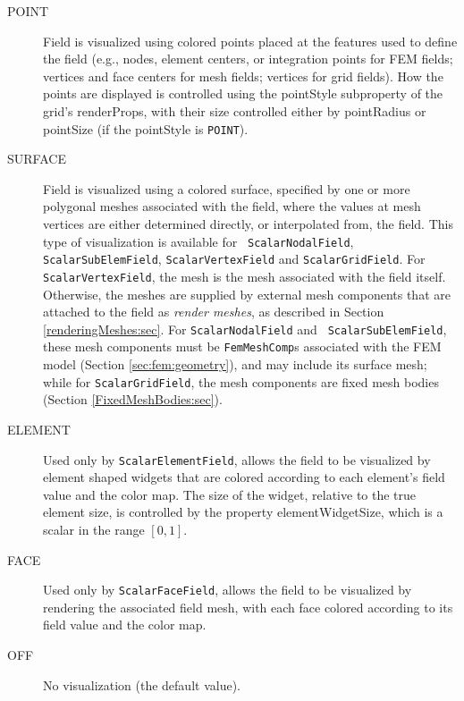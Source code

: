 \begin{description}

\item[POINT]\mbox{}

Field is visualized using colored points placed at the features used
to define the field (e.g., nodes, element centers, or integration
points for FEM fields; vertices and face centers for mesh fields;
vertices for grid fields). How the points are displayed is controlled
using the {\sf pointStyle} subproperty of the grid's {\sf
renderProps}, with their size controlled either by {\sf pointRadius}
or {\sf pointSize} (if the {\sf pointStyle} is {\tt POINT}).

\item[SURFACE]\mbox{}

Field is visualized using a colored surface, specified by one or more
polygonal meshes associated with the field, where the values at mesh
vertices are either determined directly, or interpolated from, the
field. This type of visualization is available for {\tt
ScalarNodalField}, {\tt ScalarSubElemField}, {\tt ScalarVertexField}
and {\tt ScalarGridField}. For {\tt ScalarVertexField}, the mesh is
the mesh associated with the field itself. Otherwise, the meshes are
supplied by external mesh components that are attached to the field as
{\it render meshes}, as described in Section
\ref{renderingMeshes:sec}. For {\tt ScalarNodalField} and {\tt
ScalarSubElemField}, these mesh components must be {\tt FemMeshComp}s
associated with the FEM model (Section \ref{sec:fem:geometry}), and
may include its surface mesh; while for {\tt ScalarGridField}, the
mesh components are fixed mesh bodies
(Section \ref{FixedMeshBodies:sec}).

\item[ELEMENT]\mbox{}

Used only by {\tt ScalarElementField}, allows the field to be
visualized by element shaped widgets that are colored according to
each element's field value and the color map. The size of the widget,
relative to the true element size, is controlled by the property {\sf
elementWidgetSize}, which is a scalar in the range $[0,1]$.

\item[FACE]\mbox{}

Used only by {\tt ScalarFaceField}, allows the field to be visualized
by rendering the associated field mesh, with each face colored
according to its field value and the color map.

\item[OFF]\mbox{}

No visualization (the default value).
	
\end{description}

